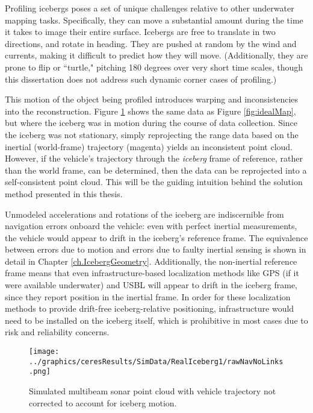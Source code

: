 Profiling icebergs poses a set of unique challenges relative to other underwater mapping tasks. Specifically, they can move a substantial amount during the time it takes to image their entire surface. Icebergs are free to translate in two directions, and rotate in heading. They are pushed at random by the wind  and currents, making it difficult to predict how they will move. (Additionally, they are prone to flip or ``turtle," pitching 180 degrees over very short time scales, though this dissertation does not address such dynamic corner cases of profiling.) 

This motion of the object being profiled introduces warping and inconsistencies into the reconstruction. Figure \ref{fig:Challenge} shows the same data as Figure \ref{fig:idealMap}, but where the iceberg was in motion during the course of data collection. Since the iceberg was not stationary, simply reprojecting the range data based on the inertial (world-frame) trajectory (magenta) yields an inconsistent point cloud. However, if the vehicle's trajectory through the \emph{iceberg} frame of reference, rather than the world frame, can be determined, then the data can be reprojected into a self-consistent point cloud. This will be the guiding intuition behind the solution method presented in this thesis.

Unmodeled accelerations and rotations of the iceberg are indiscernible from navigation errors onboard the vehicle: even with perfect inertial measurements, the vehicle would appear to drift in the iceberg's reference frame. The equivalence between errors due to motion and errors due to faulty inertial sensing is shown in detail in Chapter \ref{ch.IcebergGeometry}. Additionally, the non-inertial reference frame means that even infrastructure-based localization methods like GPS (if it were available underwater) and USBL will appear to drift in the iceberg frame, since they report position in the inertial frame. In order for these localization methods to provide drift-free iceberg-relative positioning, infrastructure would need to be installed on the iceberg itself, which is prohibitive in most cases due to risk and reliability concerns.

\begin{figure}[!htb]
   \centering
   \texttt{[image: ../graphics/ceresResults/SimData/RealIceberg1/rawNavNoLinks.png]} %
   \caption{Simulated multibeam sonar point cloud with vehicle trajectory not corrected to account for iceberg motion.}
   \label{fig:Challenge}
\end{figure}

